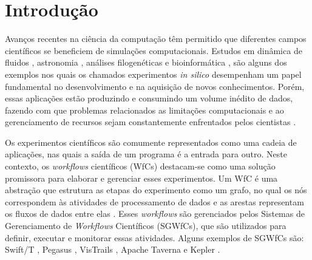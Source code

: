 \chapter{Introdução}\label{chap1}

Avanços recentes na ciência da computação têm permitido que diferentes campos científicos se beneficiem de simulações computacionais. Estudos em dinâmica de fluidos \cite{Guerra2016}, astronomia \cite{Deelman2008}, análises filogenéticas \cite{ocana2011} e bioinformática \cite{livny2008Sipht}, são alguns dos exemplos nos quais os chamados experimentos \textit{in silico} \cite{mattoso2010, Taylor2006} desempenham um papel fundamental no desenvolvimento e na aquisição de novos conhecimentos. Porém, essas aplicações estão produzindo e consumindo um volume inédito de dados, fazendo com que problemas relacionados as limitações computacionais e ao gerenciamento de recursos sejam constantemente enfrentados pelos cientistas \cite{Chen2013}.

Os experimentos científicos são comumente representados como uma cadeia de aplicações, nas quais a saída de um programa é a entrada para outro. Neste contexto, os \textit{workflows} científicos (WfCs) destacam-se como uma solução promissora para elaborar e gerenciar esses experimentos. Um WfC é uma abstração que estrutura as etapas do experimento como um grafo, no qual os nós correspondem às atividades de processamento de dados e as arestas representam os fluxos de dados entre elas \cite{mattoso2010}. Esses \textit{workflows} são gerenciados pelos Sistemas de Gerenciamento de \textit{Workflows} Científicos (SGWfCs), que são utilizados para definir, executar e monitorar essas atividades. Alguns exemplos de SGWfCs são:  Swift/T \cite{Wozniak2013}, Pegasus \cite{deelman2005}, VisTrails \cite{callahan2006}, Apache Taverna \cite{Wolstencroft2013} e Kepler \cite{Altintas2006}.


